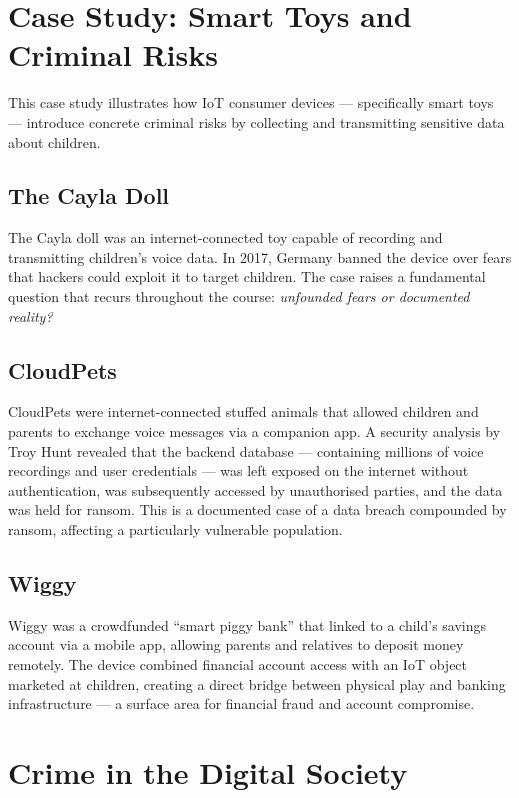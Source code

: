 \documentclass[11pt,a4paper,openany]{report}
\theoremstyle{definition}
\theoremstyle{plain}
\theoremstyle{remark}
\begin{document}
\section{Case Study: Smart Toys and Criminal Risks}

This case study illustrates how IoT consumer devices --- specifically smart toys --- introduce concrete criminal risks by collecting and transmitting sensitive data about children.

\subsection{The Cayla Doll}

The Cayla doll was an internet-connected toy capable of recording and transmitting children's voice data. In 2017, Germany banned the device over fears that hackers could exploit it to target children. The case raises a fundamental question that recurs throughout the course: \textit{unfounded fears or documented reality?}

\subsection{CloudPets}

CloudPets were internet-connected stuffed animals that allowed children and parents to exchange voice messages via a companion app. A security analysis by Troy Hunt revealed that the backend database --- containing millions of voice recordings and user credentials --- was left exposed on the internet without authentication, was subsequently accessed by unauthorised parties, and the data was held for ransom. This is a documented case of a data breach compounded by ransom, affecting a particularly vulnerable population.

\subsection{Wiggy}

Wiggy was a crowdfunded ``smart piggy bank'' that linked to a child's savings account via a mobile app, allowing parents and relatives to deposit money remotely. The device combined financial account access with an IoT object marketed at children, creating a direct bridge between physical play and banking infrastructure --- a surface area for financial fraud and account compromise.


\section{Crime in the Digital Society}
\end{document}
